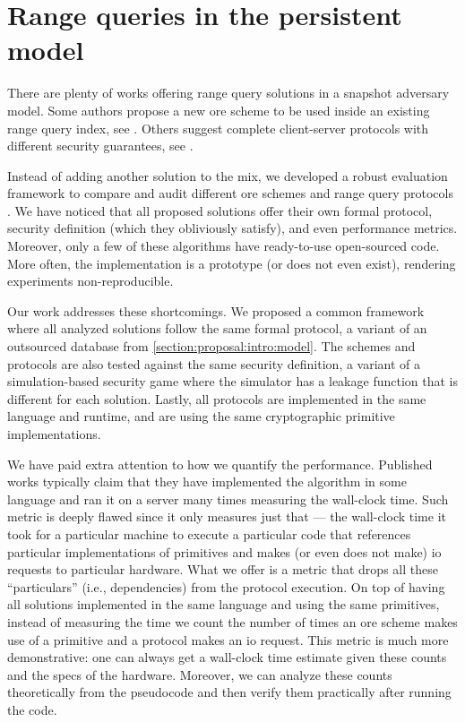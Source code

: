 \chapter{Range queries in the persistent model}
\thispagestyle{myheadings}

	There are plenty of works offering range query solutions in a snapshot adversary model.
	Some authors propose a new \acrfull{ore} scheme to be used inside an existing range query index, see \cite{bclo-ope,clww-ore,lewi-wu-ore,cloz-ore,fh-ope}.
	Others suggest complete client-server protocols with different security guarantees, see \cite{florian-protocol,pope,practical-ore}.

	Instead of adding another solution to the mix, we developed a robust evaluation framework to compare and audit different \acrshort{ore} schemes and range query protocols \cite{ore-benchmark-17}.
	We have noticed that all proposed solutions offer their own formal protocol, security definition (which they obliviously satisfy), and even performance metrics.
	Moreover, only a few of these algorithms have ready-to-use open-sourced code.
	More often, the implementation is a prototype (or does not even exist), rendering experiments non-reproducible.

	Our work addresses these shortcomings.
	We proposed a common framework where all analyzed solutions follow the same formal protocol, a variant of an outsourced database from \cref{section:proposal:intro:model}.
	The schemes and protocols are also tested against the same security definition, a variant of a simulation-based security game where the simulator has a leakage function that is different for each solution.
	Lastly, all protocols are implemented in the same language and runtime, and are using the same cryptographic primitive implementations.

	We have paid extra attention to how we quantify the performance.
	Published works typically claim that they have implemented the algorithm in some language and ran it on a server many times measuring the wall-clock time.
	Such metric is deeply flawed since it only measures just that --- the wall-clock time it took for a particular machine to execute a particular code that references particular implementations of primitives and makes (or even does not make) \acrshort{io} requests to particular hardware.
	What we offer is a metric that drops all these ``particulars'' (i.e., dependencies) from the protocol execution.
	On top of having all solutions implemented in the same language and using the same primitives, instead of measuring the time we count the number of times an \acrshort{ore} scheme makes use of a primitive and a protocol makes an \acrshort{io} request.
	This metric is much more demonstrative: one can always get a wall-clock time estimate given these counts and the specs of the hardware.
	Moreover, we can analyze these counts theoretically from the pseudocode and then verify them practically after running the code.

